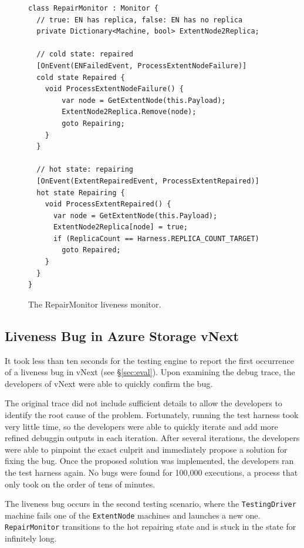 \begin{figure}[t]
\begin{lstlisting}
class RepairMonitor : Monitor {
  // true: EN has replica, false: EN has no replica
  private Dictionary<Machine, bool> ExtentNode2Replica;

  // cold state: repaired
  [OnEvent(ENFailedEvent, ProcessExtentNodeFailure)]
  cold state Repaired {
    void ProcessExtentNodeFailure() {
        var node = GetExtentNode(this.Payload);
        ExtentNode2Replica.Remove(node);
        goto Repairing;
    }
  }

  // hot state: repairing
  [OnEvent(ExtentRepairedEvent, ProcessExtentRepaired)]
  hot state Repairing {
    void ProcessExtentRepaired() {
      var node = GetExtentNode(this.Payload);
      ExtentNode2Replica[node] = true;
      if (ReplicaCount == Harness.REPLICA_COUNT_TARGET)
        goto Repaired;
    }
  }
}
\end{lstlisting}
\vspace{-4mm}
\caption{The RepairMonitor liveness monitor.}
\label{fig:monitor}
\vspace{-2mm}
\end{figure}

\subsection{Liveness Bug in Azure Storage vNext}
\label{sec:method:azurestore}

It took less than ten seconds for the \psharp testing engine to report the first occurrence of a liveness bug in vNext (see \S\ref{sec:eval}). Upon examining the debug trace, the developers of vNext were able to quickly confirm the bug.

The original \psharp trace did not include sufficient details to allow the developers to identify the root cause of the problem. Fortunately, running the test harness took very little time, so the developers were able to quickly iterate and add more refined debuggin outputs in each iteration. After several iterations, the developers were able to pinpoint the exact culprit and immediately propose a solution for fixing the bug. Once the proposed solution was implemented, the developers ran the test harness again. No bugs were found for 100,000 executions, a process that only took on the order of tens of minutes.

The liveness bug occurs in the second testing scenario, where the \texttt{TestingDriver} machine fails one of the \texttt{ExtentNode} machines and launches a new one. \texttt{RepairMonitor} transitions to the hot repairing state and is stuck in the state for infinitely long.

